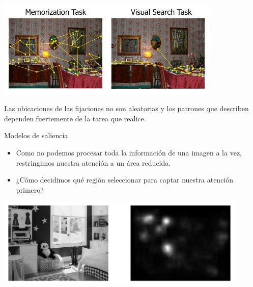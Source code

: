 \documentclass[compress]{beamer}
\begin{document}
\begin{frame}
\begin{center}
\includegraphics[width=0.8\textwidth]{images/castelhano-fixations.jpg}
\end{center}

Las ubicaciones de las fijaciones no son aleatorias y los patrones que describen dependen fuertemente de la tarea que realice.
\end{frame}

\begin{frame}{Modelos de saliencia}

\begin{itemize}
\item Como no podemos procesar toda la información de una imagen a la vez, restringimos nuestra atención a un área reducida. 
\item ¿Cómo decidimos qué región seleccionar para captar nuestra atención primero?
\end{itemize}

\begin{center}
\includegraphics[width=0.9\textwidth]{images/ejemplo-mlnet.png}
\end{center}

\end{frame}
\end{document}
